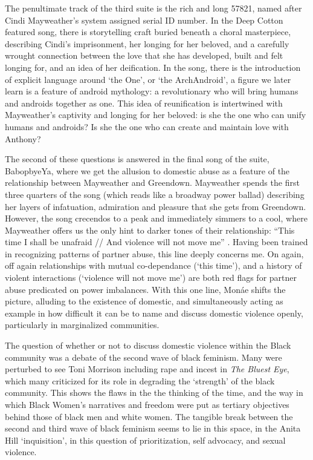 \documentclass[a4paper, 11pt]{article} %
\begin{document}
The penultimate track of the third suite is the rich and long 57821, named after Cindi Mayweather's system assigned serial ID number.
In the Deep Cotton featured song, there is storytelling craft buried beneath a choral masterpiece, describing Cindi's imprisonment, her longing for her beloved, and a carefully wrought connection between the love that she has developed, built and felt longing for, and an idea of her deification.
In the song, there is the introduction of explicit language around `the One', or `the ArchAndroid', a figure we later learn is a feature of android mythology: a revolutionary who will bring humans and androids together as one.
This idea of reunification is intertwined with Mayweather's captivity and longing for her beloved: is she the one who can unify humans and androids? Is she the one who can create and maintain love with Anthony?

The second of these questions is answered in the final song of the suite, BabopbyeYa, where we get the allusion to domestic abuse as a feature of the relationship between Mayweather and Greendown.
Mayweather spends the first three quarters of the song (which reads like a broadway power ballad) describing her layers of infatuation, admiration and pleasure that she gets from Greendown.
However, the song crecendos to a peak and immediately simmers to a cool, where Mayweather offers us the only hint to darker tones of their relationship: ``This time I shall be unafraid // And violence will not move me'' \cite{babopbyeya}.
Having been trained in recognizing patterns of partner abuse, this line deeply concerns me.
On again, off again relationships with mutual co-dependance (`this time'), and a history of violent interactions (`violence will not move me') are both red flags for partner abuse predicated on power imbalances.
With this one line, Mon\'ae shifts the picture, alluding to the existence of domestic, and simultaneously acting as example in how difficult it can be to name and discuss domestic violence openly, particularly in marginalized communities.

The question of whether or not to discuss domestic violence within the Black community was a debate of the second wave of black feminism.
Many were perturbed to see Toni Morrison including rape and incest in \emph{The Bluest Eye}, which many criticized for its role in degrading the `strength' of the black community.
This shows the flaws in the the thinking of the time, and the way in which Black Women's narratives and freedom were put as tertiary objectives behind those of black men and white women.
The tangible break between the second and third wave of black feminism seems to lie in this space, in the Anita Hill `inquisition', in this question of prioritization, self advocacy, and sexual violence.
\end{document}
